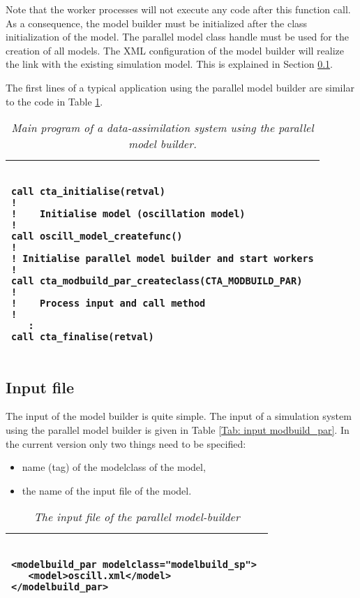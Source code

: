 Note that the worker processes will not execute any code after this function
call. As a consequence, the model builder must be initialized after the
class initialization of the model. The parallel model class handle must be
used for the creation of all models. The XML configuration of the
model builder will realize the link with the existing simulation model. This is
explained in Section \ref{Sec:input-file}. 

The first lines of a typical application using the parallel model builder
are similar to the code in Table \ref{Tab: main program}.


\begin{table}[ht]
\begin{tabular}{|l|}
\hline
\begin{minipage}{16cm}
\begin{verbatim}

call cta_initialise(retval)
!
!    Initialise model (oscillation model)
!
call oscill_model_createfunc()
!
! Initialise parallel model builder and start workers
!
call cta_modbuild_par_createclass(CTA_MODBUILD_PAR)
!
!    Process input and call method
!     
   :
call cta_finalise(retval)

\end{verbatim}
\end{minipage}
\\
\hline
\end{tabular}
\caption{\em Main program of a data-assimilation system using the parallel
model builder.}
\label{Tab: main program}
\end{table}


\subsection{Input file} \label{Sec:input-file}
The input of the model builder is quite simple. The input of a simulation
system using the parallel model builder is given in Table \ref{Tab: input
modbuild_par}. In the current version only two things need to
be specified:
\begin{itemize}
\item name (tag) of the modelclass of the model,
\item the name of the input file of the model.
\end{itemize}


\begin{table}[h]
\begin{tabular}{|l|}
\hline
\begin{minipage}{16cm}
\begin{verbatim}

<modelbuild_par modelclass="modelbuild_sp"> 
   <model>oscill.xml</model>
</modelbuild_par> 

\end{verbatim}
\end{minipage}
\\
\hline
\end{tabular}
\caption{\em The input file of the parallel model-builder}
\label{Tab: input modbuild_par}
\end{table}

